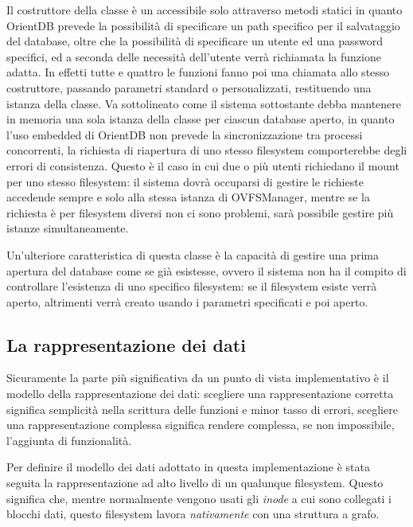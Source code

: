 Il costruttore della classe è un accessibile solo attraverso metodi statici in quanto OrientDB prevede la possibilità di specificare un path specifico per il salvataggio del database, oltre che la possibilità di specificare un utente ed una password specifici, ed a seconda delle necessità dell'utente verrà richiamata la funzione adatta. In effetti tutte e quattro le funzioni fanno poi una chiamata allo stesso costruttore, passando parametri standard o personalizzati, restituendo una istanza della classe. Va sottolineato come il sistema sottostante debba mantenere in memoria una sola istanza della classe per ciascun database aperto, in quanto l'uso embedded di OrientDB non prevede la sincronizzazione tra processi concorrenti, la richiesta di riapertura di uno stesso filesystem comporterebbe degli errori di consistenza. Questo è il caso in cui due o più utenti richiedano il mount per uno stesso filesystem: il sistema dovrà occuparsi di gestire le richieste accedende sempre e solo alla stessa istanza di OVFSManager, mentre se la richiesta è per filesystem diversi non ci sono problemi, sarà possibile gestire più istanze simultaneamente.

Un'ulteriore caratteristica di questa classe è la capacità di gestire una prima apertura del database come se già esistesse, ovvero il sistema non ha il compito di controllare l'esistenza di uno specifico filesystem: se il filesystem esiste verrà aperto, altrimenti verrà creato usando i parametri specificati e poi aperto.

\subsection {La rappresentazione dei dati}
Sicuramente la parte più significativa da un punto di vista implementativo è il modello della rappresentazione dei dati: scegliere una rappresentazione corretta significa semplicità nella scrittura delle funzioni e minor tasso di errori, scegliere una rappresentazione complessa significa rendere complessa, se non impossibile, l'aggiunta di funzionalità.

Per definire il modello dei dati adottato in questa implementazione è stata seguita la rappresentazione ad alto livello di un qualunque filesystem. Questo significa che, mentre normalmente vengono usati gli \emph{inode} a cui sono collegati i blocchi dati, questo filesystem lavora \emph{nativamente} con una struttura a grafo.

